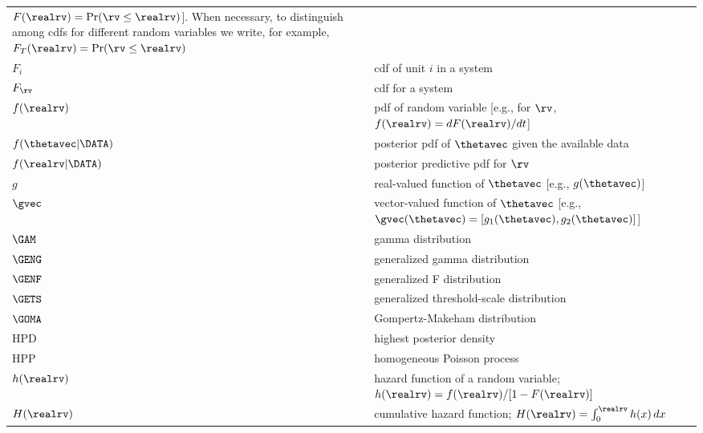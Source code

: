 \begin{supertabular}{p{0.9in}lp{4.0in}}
  $F(\realrv)=  \Pr(\rv \le \realrv)$].
  When necessary, to distinguish among cdfs for 
  different random variables 
  we write, for example, $F_{T}(\realrv)=\Pr(\rv \le \realrv)$
   \\
$F_{i}$  &  
    &                            
  cdf of unit  $i$   in a system
   \\
$F_{\rv}$  &  
    &                            
  cdf for a  system 
   \\
$f(\realrv)$  &  
    &
pdf of random variable [e.g., for $\rv$,
$f(\realrv)=d F(\realrv)/dt$]
   \\
$f(\thetavec | \DATA)$  &  
    &
posterior
pdf of $\thetavec$ given the available
data
   \\
$f(\realrv | \DATA)$  &  
    &
posterior predictive pdf for $\rv$
    \\
$g$ &
    &
real-valued function of $\thetavec$ [e.g.,
$g(\thetavec)$]
   \\
$\gvec$       &
&vector-valued function of $\thetavec$ 
[e.g., $\gvec(\thetavec)=[g_{1}(\thetavec), g_{2}(\thetavec)]$]
   \\
$\GAM$ & 
& gamma distribution
   \\
$\GENG$ & 
& generalized gamma distribution
  \\
$\GENF$       &
&generalized F distribution
    \\
$\GETS$ & 
& generalized threshold-scale distribution
  \\
$\GOMA$       &
&Gompertz-Makeham distribution
  \\
HPD        &
&highest posterior density
  \\
HPP        &
&homogeneous Poisson process
   \\
$h(\realrv)$     & 
              &
hazard function of a random variable;
$h(\realrv)=f(\realrv)/[1-F(\realrv)]$
   \\
$H(\realrv)$     & 
              &
cumulative hazard function; $H(\realrv) = \int^{\realrv}_{0} h(x)\,dx$
   \\

\end{supertabular}
